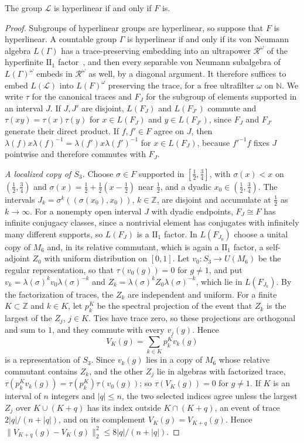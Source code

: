 \begin{proposition}\label{prop:thompson-hyperlinear}
The group $\mathcal L$ is hyperlinear if and only if $F$ is.
\end{proposition}

\begin{proof}
Subgroups of hyperlinear groups are hyperlinear, so suppose that $F$ is hyperlinear. A countable group $\Gamma$ is hyperlinear if and only if
its von Neumann algebra $L(\Gamma)$ has a trace-preserving embedding into an ultrapower $\mathcal R^\omega$ of the hyperfinite
$\mathrm{II}_1$ factor~\cite{CapraroLupini2015}, and then every separable von Neumann subalgebra of $L(\Gamma)^\omega$ embeds in
$\mathcal R^\omega$ as well, by a diagonal argument. It therefore suffices to embed $L(\mathcal L)$ into $L(F)^\omega$ preserving the trace,
for a free ultrafilter $\omega$ on $\mathbb N$. We write $\tau$ for the canonical traces and $F_J$ for the subgroup of elements supported in an
interval $J$. If $J,J'$ are disjoint, $L(F_J)$ and $L(F_{J'})$ commute and $\tau(xy)=\tau(x)\tau(y)$ for $x\in L(F_J)$ and $y\in L(F_{J'})$,
since $F_J$ and $F_{J'}$ generate their direct product. If $f,f'\in F$ agree on $J$, then $\lambda(f)x\lambda(f)^{-1}=\lambda(f')x\lambda(f')^{-1}$
for $x\in L(F_J)$, because $f'^{-1}f$ fixes $J$ pointwise and therefore commutes with $F_J$.

\emph{A localized copy of $S_3$.} Choose $\sigma\in F$ supported in $[\frac12,\frac34]$, with $\sigma(x)<x$ on $(\frac12,\frac34)$ and
$\sigma(x)=\frac12+\frac12(x-\frac12)$ near $\frac12$, and a dyadic $x_0\in(\frac12,\frac34)$. The intervals
$J_k=\sigma^k((\sigma(x_0),x_0))$, $k\in\mathbb Z$, are disjoint and accumulate at $\frac12$ as $k\to\infty$. For a nonempty open interval $J$ with
dyadic endpoints, $F_J\cong F$ has infinite conjugacy classes, since a nontrivial element has conjugates with infinitely many different
supports, so $L(F_J)$ is a $\mathrm{II}_1$ factor. In $L(F_{J_0})$ choose a unital copy of $M_6$ and, in its relative commutant, which is again a
$\mathrm{II}_1$ factor, a self-adjoint $Z_0$ with uniform distribution on $[0,1]$. Let $v_0:S_3\to U(M_6)$ be the regular representation, so
that $\tau(v_0(g))=0$ for $g\ne1$, and put $v_k=\lambda(\sigma)^kv_0\lambda(\sigma)^{-k}$ and $Z_k=\lambda(\sigma)^kZ_0\lambda(\sigma)^{-k}$,
which lie in $L(F_{J_k})$. By the factorization of traces, the $Z_k$ are independent and uniform. For a finite $K\subset\mathbb Z$ and $k\in K$,
let $p^K_k$ be the spectral projection of the event that $Z_k$ is the largest of the $Z_j$, $j\in K$. Ties have trace zero, so these projections
are orthogonal and sum to $1$, and they commute with every $v_j(g)$. Hence
\[
V_K(g)=\sum_{k\in K}p^K_kv_k(g)
\]
is a representation of $S_3$. Since $v_k(g)$ lies in a copy of $M_6$ whose relative commutant contains $Z_k$, and the other $Z_j$ lie in
algebras with factorized trace, $\tau(p^K_kv_k(g))=\tau(p^K_k)\tau(v_0(g))$; so $\tau(V_K(g))=0$ for $g\ne1$. If $K$ is an interval of $n$ integers and $|q|\le n$,
the two selected indices agree unless the largest $Z_j$ over $K\cup(K+q)$ has its index outside $K\cap(K+q)$, an event of trace
$2|q|/(n+|q|)$, and on its complement $V_K(g)=V_{K+q}(g)$. Hence $\|V_{K+q}(g)-V_K(g)\|_2^2\le8|q|/(n+|q|)$.


\end{proof}
